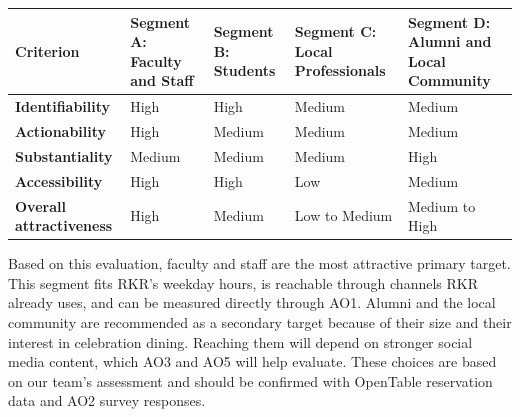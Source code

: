 \documentclass[
  12pt,
  letterpaper,
  DIV=11,
  numbers=noendperiod]{scrartcl}
\begin{document}
\begin{longtable}[]{@{}
  >{\raggedright\arraybackslash}p{}
  >{\raggedright\arraybackslash}p{}
  >{\raggedright\arraybackslash}p{}
  >{\raggedright\arraybackslash}p{}
  >{\raggedright\arraybackslash}p{}@{}}
\toprule\noalign{}
\begin{minipage}[b]{\linewidth}\raggedright
Criterion
\end{minipage} & \begin{minipage}[b]{\linewidth}\raggedright
Segment A: Faculty and Staff
\end{minipage} & \begin{minipage}[b]{\linewidth}\raggedright
Segment B: Students
\end{minipage} & \begin{minipage}[b]{\linewidth}\raggedright
Segment C: Local Professionals
\end{minipage} & \begin{minipage}[b]{\linewidth}\raggedright
Segment D: Alumni and Local Community
\end{minipage} \\
\midrule\noalign{}
\endhead
\bottomrule\noalign{}
\endlastfoot
\textbf{Identifiability} & High & High & Medium & Medium \\
\textbf{Actionability} & High & Medium & Medium & Medium \\
\textbf{Substantiality} & Medium & Medium & Medium & High \\
\textbf{Accessibility} & High & High & Low & Medium \\
\textbf{Overall attractiveness} & High & Medium & Low to Medium & Medium
to High \\
\end{longtable}

Based on this evaluation, faculty and staff are the most attractive
primary target. This segment fits RKR's weekday hours, is reachable
through channels RKR already uses, and can be measured directly through
AO1. Alumni and the local community are recommended as a secondary
target because of their size and their interest in celebration dining.
Reaching them will depend on stronger social media content, which AO3
and AO5 will help evaluate. These choices are based on our team's
assessment and should be confirmed with OpenTable reservation data and
AO2 survey responses.
\end{document}
